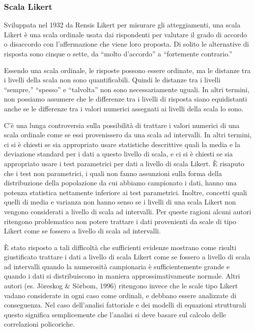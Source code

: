 \subsubsection{Scala Likert} 

Sviluppata nel 1932 da Rensis Likert per misurare gli atteggiamenti, una scala Likert è una scala ordinale usata dai rispondenti per valutare il grado di accordo o disaccordo con l'affermazione che viene loro proposta. Di solito le alternative di risposta sono cinque o sette, da ``molto d’accordo'' a ``fortemente contrario.''

Essendo una scala ordinale, le risposte possono essere ordinate, ma le distanze tra i livelli della scala non sono quantificabili. Quindi le distanze tra i livelli ``sempre,'' ``spesso'' e ``talvolta'' non sono necessariamente uguali. In altri termini, non possiamo assumere che le differenze tra i livelli di risposta siano equidistanti anche se le differenze tra i valori numerici assegnati ai livelli della scala lo sono. 

C'è una lunga controversia sulla possibilità di trattare i valori numerici di una scala ordinale come se essi provenissero da una scala ad intervalli. In altri termini, ci si è chiesti se sia appropriato usare statistiche descrittive quali la media e la deviazione standard per i dati a questo livello di scala, e ci si è chiesti se sia appropriato usare i test parametrici per dati a livello di scala Likert. È risaputo che i test non parametrici, i quali non fanno assunzioni sulla forma della distribuzione della popolazione da cui abbiamo campionato i dati, hanno una potenza statistica nettamente inferiore ai test parametrici. Inoltre, concetti quali quelli di media e varianza non hanno senso se i livelli di una scala Likert non vengono considerati a livello di scala ad intervalli. Per queste ragioni alcuni autori ritengono problematico non potere trattare i dati provenienti da scale di tipo Likert come se fossero a livello di scala ad intervalli.

È stato risposto a tali difficoltà che sufficienti evidenze mostrano come risulti giustificato trattare i dati a livello di scala Likert come se fossero a livello di scala ad intervalli quando la numerosità campionaria è sufficientemente grande e quando i dati si distribuiscono in maniera approssimativamente normale. Altri autori (es. Jöreskog \& Sörbom, 1996) ritengono invece che le scale tipo Likert vadano considerate in ogni caso come ordinali, e debbano essere analizzate di conseguenza. Nel caso dell'analisi fattoriale e dei modelli di equazioni strutturali questo significa semplicemente che l'analisi si deve basare sul calcolo delle correlazioni policoriche.

